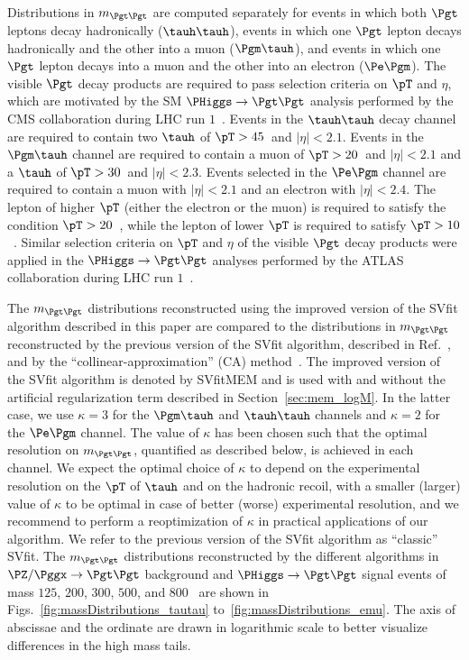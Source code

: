 Distributions in $m_{\Pgt\Pgt}$ are computed separately for events in which 
both $\Pgt$ leptons decay hadronically ($\tauh\tauh$), 
events in which one $\Pgt$ lepton decays hadronically and the other into a muon ($\Pgm\tauh$),
and events in which one $\Pgt$ lepton decays into a muon and the other into an electron ($\Pe\Pgm$).
The visible $\Pgt$ decay products are required to pass selection criteria on $\pT$ and $\eta$,
which are motivated by the SM $\PHiggs \to \Pgt\Pgt$ analysis performed by the CMS collaboration during LHC run $1$~\cite{HIG-13-004}.
Events in the $\tauh\tauh$ decay channel are required to contain
two $\tauh$ of $\pT > 45$~\GeV and $\vert\eta\vert < 2.1$.
Events in the $\Pgm\tauh$ channel
are required to contain a muon of $\pT > 20$~\GeV and $\vert\eta\vert < 2.1$ and a $\tauh$ of $\pT > 30$~\GeV and $\vert\eta\vert < 2.3$.
Events selected in the $\Pe\Pgm$ channel are required to contain a muon with $\vert\eta\vert < 2.1$ and an electron with $\vert\eta\vert < 2.4$.
The lepton of higher $\pT$ (either the electron or the muon) is required to satisfy the condition $\pT > 20$~\GeV,
while the lepton of lower $\pT$ is required to satisfy $\pT > 10$~\GeV.
Similar selection criteria on $\pT$ and $\eta$ of the visible $\Pgt$ decay products were applied in the $\PHiggs \to \Pgt\Pgt$
analyses performed by the ATLAS
collaboration during LHC run $1$~\cite{ATLAS_HiggsTauTau_SM,ATLAS_HiggsTauTau_MSSM}.

The $m_{\Pgt\Pgt}$ distributions reconstructed using the 
improved version of the SVfit algorithm described in this paper
are compared to the distributions in $m_{\Pgt\Pgt}$ reconstructed by the previous version of the
SVfit algorithm, described in Ref.~\cite{SVfit}, and by the ``collinear-approximation'' (CA)
method~\cite{massRecoCollinearApprox}.
The improved version of the SVfit algorithm is denoted by SVfitMEM 
and is used with and without the artificial regularization term described in Section~\ref{sec:mem_logM}.
In the latter case, we use $\kappa = 3$ for the $\Pgm\tauh$ and $\tauh\tauh$ channels and $\kappa = 2$ for the $\Pe\Pgm$ channel.
The value of $\kappa$ has been chosen such that the optimal resolution on $m_{\Pgt\Pgt}$, quantified as described below, is achieved in each channel.
We expect the optimal choice of $\kappa$ to depend on the experimental resolution on the $\pT$ of $\tauh$ and on the hadronic recoil,
with a smaller (larger) value of $\kappa$ to be optimal in case of better (worse) experimental resolution,
and we recommend to perform a reoptimization of $\kappa$ in practical applications of our algorithm.
We refer to the previous version of the SVfit algorithm as ``classic'' SVfit.
The $m_{\Pgt\Pgt}$ distributions reconstructed by the different algorithms
in $\PZ/\Pggx \to \Pgt\Pgt$ background and $\PHiggs \to \Pgt\Pgt$ signal events
of mass $125$, $200$, $300$, $500$, and $800$~\GeV
are shown in Figs.~\ref{fig:massDistributions_tautau} to~\ref{fig:massDistributions_emu}.
The axis of abscissae and the ordinate are drawn in logarithmic scale to better visualize differences in the high mass tails.

